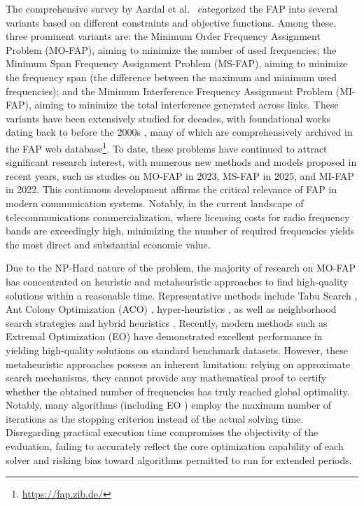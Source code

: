 \documentclass[letterpaper,journal]{IEEEtran}
\begin{document}
The comprehensive survey by Aardal et al.~\cite{Aardal2007} categorized the FAP into several variants based on different constraints and objective functions. 
Among these, three prominent variants are: the Minimum Order Frequency Assignment Problem (MO-FAP), aiming to minimize the number of used frequencies; the Minimum Span Frequency Assignment Problem (MS-FAP), aiming to minimize the frequency span (the difference between the maximum and minimum used frequencies); and the Minimum Interference Frequency Assignment Problem (MI-FAP), aiming to minimize the total interference generated across links. 
These variants have been extensively studied for decades, with foundational works dating back to before the 2000s \cite{Aardal2007}, many of which are comprehensively archived in the FAP web database\footnote{\label{fn:fap_db}\url{https://fap.zib.de/}}.
To date, these problems have continued to attract significant research interest, with numerous new methods and models proposed in recent years, such as studies on MO-FAP \cite{Gomez2023MO} in 2023, MS-FAP \cite{Lee2025MS} in 2025, and MI-FAP \cite{Ceschia2022MI} in 2022.
This continuous development affirms the critical relevance of FAP in modern communication systems.
Notably, in the current landscape of telecommunications commercialization, where licensing costs for radio frequency bands are exceedingly high, minimizing the number of required frequencies yields the most direct and substantial economic value.

Due to the NP-Hard nature of the problem, the majority of research on MO-FAP has concentrated on heuristic and metaheuristic approaches to find high-quality solutions within a reasonable time. 
Representative methods include Tabu Search \cite{Dib2009,Alrajhi2016_Dynamic,Alrajhi2016_Hybridized}, Ant Colony Optimization (ACO) \cite{Alrajhi2023DynamicACO}, hyper-heuristics \cite{Mahmoudi2023}, as well as neighborhood search strategies and hybrid heuristics \cite{Alrajhi2023Neighborhood}. 
Recently, modern methods such as Extremal Optimization (EO) \cite{Gomez2023MO} have demonstrated excellent performance in yielding high-quality solutions on standard benchmark datasets. 
However, these metaheuristic approaches possess an inherent limitation: relying on approximate search mechanisms, they cannot provide any mathematical proof to certify whether the obtained number of frequencies has truly reached global optimality. 
Notably, many algorithms (including EO \cite{Gomez2023MO}) employ the maximum number of iterations as the stopping criterion instead of the actual solving time. 
Disregarding practical execution time compromises the objectivity of the evaluation, failing to accurately reflect the core optimization capability of each solver and risking bias toward algorithms permitted to run for extended periods.
\end{document}
